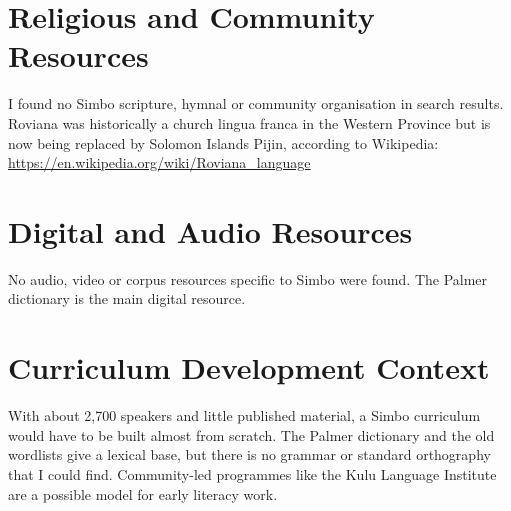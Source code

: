 \documentclass[12pt]{article}
\begin{document}
\section{Religious and Community Resources}
I found no Simbo scripture, hymnal or community organisation in search results. Roviana was historically a church lingua franca in the Western Province but is now being replaced by Solomon Islands Pijin, according to Wikipedia: \url{https://en.wikipedia.org/wiki/Roviana_language}

\section{Digital and Audio Resources}
No audio, video or corpus resources specific to Simbo were found. The Palmer dictionary is the main digital resource.

\section{Curriculum Development Context}
With about 2,700 speakers and little published material, a Simbo curriculum would have to be built almost from scratch. The Palmer dictionary and the old wordlists give a lexical base, but there is no grammar or standard orthography that I could find. Community-led programmes like the Kulu Language Institute are a possible model for early literacy work.
\end{document}
